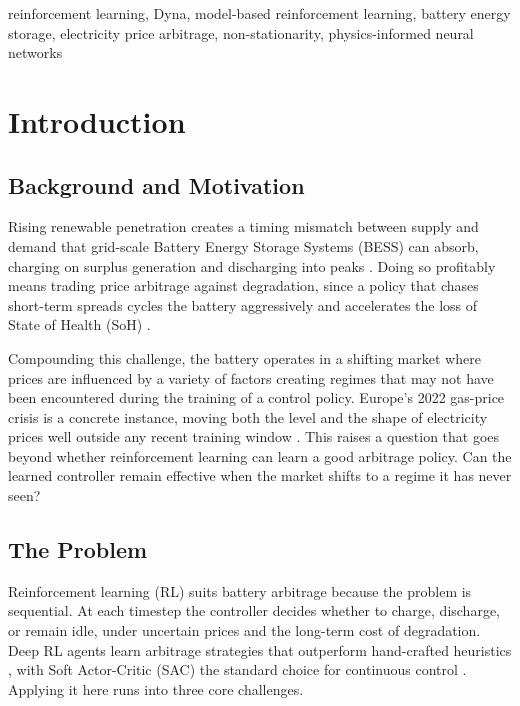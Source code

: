 \documentclass[conference]{IEEEtran}
\begin{document}
\begin{IEEEkeywords}
reinforcement learning, Dyna, model-based reinforcement learning, battery energy storage, electricity price arbitrage, non-stationarity, physics-informed neural networks
\end{IEEEkeywords}

\section{Introduction}

\subsection{Background and Motivation}

Rising renewable penetration creates a timing mismatch between supply and demand that grid-scale Battery Energy Storage Systems (BESS) can absorb, charging on surplus generation and discharging into peaks \citep{aneke2016storage}. Doing so profitably means trading price arbitrage against degradation, since a policy that chases short-term spreads cycles the battery aggressively and accelerates the loss of State of Health (SoH) \citep{xu2018degradation}.

Compounding this challenge, the battery operates in a shifting market where prices are influenced by a variety of factors creating regimes that may not have been encountered during the training of a control policy. Europe's 2022 gas-price crisis is a concrete instance, moving both the level and the shape of electricity prices well outside any recent training window \citep{iea2022weo}. This raises a question that goes beyond whether reinforcement learning can learn a good arbitrage policy. Can the learned controller remain effective when the market shifts to a regime it has never seen?

\subsection{The Problem}
\label{sec:problem}

Reinforcement learning (RL) suits battery arbitrage because the problem is sequential. At each timestep the controller decides whether to charge, discharge, or remain idle, under uncertain prices and the long-term cost of degradation. Deep RL agents learn arbitrage strategies that outperform hand-crafted heuristics \citep{cao2020arbitrage}, with Soft Actor-Critic (SAC) the standard choice for continuous control \citep{haarnoja2018softactorcriticoffpolicymaximum}. Applying it here runs into three core challenges.
\end{document}
